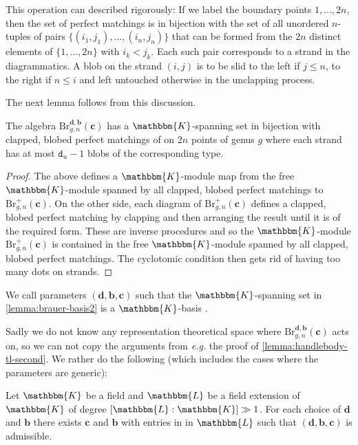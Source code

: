 \documentclass[a4paper,11pt]{amsart}
\let\emph\relax
\newcommand{\eg}{\textsl{e.g.}}
\renewcommand{\dots}{\text{...}}
\newcommand{\setstuff}[1]{\mathrm{#1}}
\newcommand{\KK}{\mathbbm{K}}
\newcommand{\KKL}{\mathbbm{L}}
\newcommand{\bsym}[1]{\boldsymbol{#1}}
\newcommand{\varsym}[1]{\mathtt{#1}}
\newcommand{\cpar}{\bsym{c}}
\newcommand{\bpar}{\bsym{b}}
\newcommand{\dpar}{\bsym{d}}
\newcommand{\dvar}{\varsym{d}}
\numberwithin{equation}{section}
\let\fullref\autoref
\begin{document}
This operation can described rigorously: 
If we label the boundary 
points $1,\dots,2n$, then  
the set of perfect matchings is in 
bijection with the set of all 
unordered $n$-tuples of pairs 
$\{(i_{1},j_{1}),\dots,(i_{n},j_{n})\}$ that can be formed from the $2n$ 
distinct elements of $\{1,\dots,2n\}$ with $i_{k}<j_{k}$. Each such pair corresponds to a strand in the diagrammatics. 
A blob on the strand $(i,j)$ is to be slid to the 
left if $j\leq n$, to the right if $n\leq i$ 
and left untouched otherwise in the unclapping process.

The next lemma follows from this discussion.

\begin{lemma}\label{lemma:brauer-basis2}
The algebra 
$\setstuff{Br}_{g,n}^{\dpar,\bpar}(\cpar)$ 
has a $\KK$-spanning set in bijection with clapped, blobed 
perfect matchings of 
on $2n$ points of genus  
$g$ where each strand has at 
most $\dvar_{u}-1$ blobs of the corresponding type.
\end{lemma}

\begin{proof}
The above defines a $\KK$-module map from 
the free $\KK$-module spanned by all 
clapped, blobed perfect matchings to 
$\setstuff{Br}^{+}_{g,n}(\cpar)$.	
On the other side, each diagram of 
$\setstuff{Br}^{+}_{g,n}(\cpar)$ defines a 
clapped, blobed perfect 
matching by clapping and then arranging the result until it is of the required form.
These are inverse 
procedures and so the $\KK$-module 
$\setstuff{Br}^{+}_{g,n}(\cpar)$ 
is contained in the free 
$\KK$-module spanned by all 
clapped, blobed perfect matchings.
The cyclotomic condition then gets rid of 
having too many dots on strands.
\end{proof}

\begin{definition}\label{def:bmw-admissible}
We call parameters $(\dpar,\bpar,\cpar)$ such that the $\KK$-spanning set 
in \fullref{lemma:brauer-basis2} is a $\KK$-basis \emph{admissible}.
\end{definition}

Sadly we do not know any representation theoretical space 
where $\setstuff{Br}_{g,n}^{\dpar,\bpar}(\cpar)$ acts on, 
so we can not copy the arguments from {\eg} the proof of \fullref{lemma:handlebody-tl-second}. We rather do the following 
(which includes the cases where the parameters are generic):

\begin{lemma}\label{lemma:handlebody-blobbmw-second}
Let $\KK$ be a field and
$\KKL$ be a field extension of $\KK$ 
of degree $[\KKL:\KK]\gg 1$.
For each choice of $\dpar$ and $\bpar$ 
there exists $\cpar$ and $\bpar$ with entries in
in $\KKL$ such that $(\dpar,\bpar,\cpar)$ is admissible.
\end{lemma}
\end{document}
